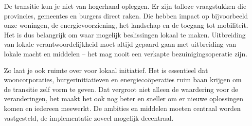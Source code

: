 
De transitie kun je niet van hogerhand opleggen. Er zijn talloze vraagstukken die provincies, gemeentes en burgers direct raken. Die hebben impact op bijvoorbeeld onze woningen, de energievoorziening, het landschap en de toegang tot mobiliteit. Het is dus belangrijk om waar mogelijk beslissingen lokaal te maken. Uitbreiding van lokale verantwoordelijkheid moet altijd gepaard gaan met uitbreiding van lokale macht en middelen – het mag nooit een verkapte bezuinigingsoperatie zijn.

Zo laat je ook ruimte over voor lokaal initiatief. Het is essentieel dat wooncorporaties, burgerinitiatieven en energiecoöperaties ruim baan krijgen om de transitie zelf vorm te geven. Dat vergroot niet alleen de waardering voor de veranderingen, het maakt het ook nog beter en sneller om er nieuwe oplossingen komen en iedereen meewerkt. De ambities en middelen moeten centraal worden vastgesteld, de implementatie zoveel mogelijk decentraal.
